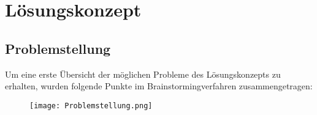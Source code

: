\section{Lösungskonzept} \label{sec:loesungskonzept}
\subsection{Problemstellung} \label{subsec:problemstellung}
Um eine erste Übersicht der möglichen Probleme des Lösungskonzepts zu erhalten, wurden folgende Punkte im Brainstormingverfahren zusammengetragen:
\begin{figure}[h]
	\centering
	\texttt{[image: Problemstellung.png]}
	\label{fig:Figure}
\end{figure}










